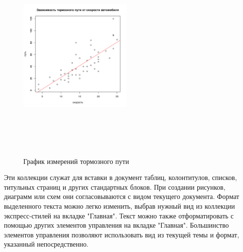 \documentclass{article}
\begin{document}
\begin{figure}[h]
    \centering
    \includegraphics[height=10cm,width=0.5\textwidth,keepaspectratio,%
    trim=0 0.5cm 0 1.5cm,clip%
    ]{plot_cars_distance}
    
    
    {График измерений тормозного пути}
\end{figure}


Эти коллекции служат для вставки в документ таблиц, колонтитулов, списков, титульных страниц и других стандартных блоков. При создании рисунков, диаграмм или схем они согласовываются с видом текущего документа. Формат выделенного текста можно легко изменить, выбрав нужный вид из коллекции экспресс-стилей на вкладке "Главная". Текст можно также отформатировать с помощью других элементов управления на вкладке "Главная". Большинство элементов управления позволяют использовать вид из текущей темы и формат, указанный непосредственно.

\vspace{18pt}
\end{document}
